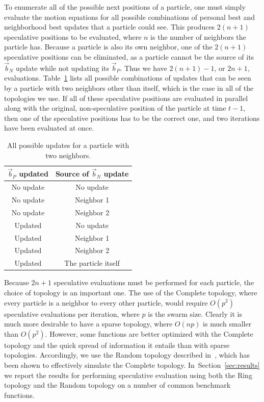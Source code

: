 \documentclass[oneside,honors]{honors}
\renewcommand{\sec}[1]{Section~\ref{sec:#1}}
\providecommand{\nbest}{\ensuremath{\Vec{b}_N}}
\providecommand{\pbest}{\ensuremath{\Vec{b}_P}}
\begin{document}
To enumerate all of the possible next positions of a particle, one must simply
evaluate the motion equations for all possible combinations of personal best
and neighborhood best updates that a particle could see.  This produces
$2(n+1)$ speculative positions to be evaluated, where $n$ is the number of
neighbors the particle has.  Because a particle is also its own neighbor, one
of the $2(n+1)$ speculative positions can be eliminated, as a particle cannot
be the source of its $\nbest$ update while not updating its $\pbest$.  Thus we
have $2(n+1)-1$, or $2n+1$, evaluations.  Table~\ref{tab:evals} lists all
possible combinations of updates that can be seen by a particle with two
neighbors other than itself, which is the case in all of the topologies we use.
If all of these speculative positions are evaluated in parallel along with the
original, non-speculative position of the particle at time $t-1$, then one of
the speculative positions has to be the correct one, and two iterations have
been evaluated at once.

\begin{table}
  \caption{All possible updates for a particle with two neighbors.}
  \label{tab:evals}
  \centering
  \begin{tabular}{cc}
	$\pbest$ updated&Source of $\nbest$ update\\
	\hline
	\hline
	No update&No update\\
	\hline
	No update&Neighbor 1\\
	\hline
	No update&Neighbor 2\\
	\hline
	Updated&No update\\
	\hline
	Updated&Neighbor 1\\
	\hline
	Updated&Neighbor 2\\
	\hline
	Updated&The particle itself\\
	\hline
  \end{tabular}
\end{table}

Because $2n+1$ speculative evaluations must be performed for each particle, the
choice of topology is an important one.  The use of the Complete topology,
where every particle is a neighbor to every other particle, would require
$O(p^2)$ speculative evaluations per iteration, where $p$ is the swarm size.
Clearly it is much more desirable to have a sparse topology, where $O(np)$ is
much smaller than $O(p^2)$.  However, some functions are better optimized with
the Complete topology and the quick spread of information it entails than with
sparse topologies.  Accordingly, we use the Random topology described
in~\cite{mcnabb-cec09}, which has been shown to effectively simulate the
Complete topology.  In~\sec{results} we report the results for performing
speculative evaluation using both the Ring topology and the Random topology on
a number of common benchmark functions.
\end{document}
